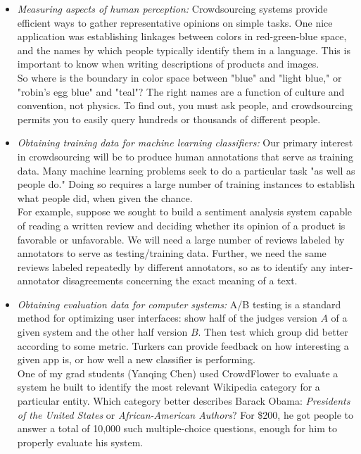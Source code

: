 \documentclass[10pt]{article}
\begin{document}
\begin{itemize}
    \item \textit{Measuring aspects of human perception:} Crowdsourcing systems provide efficient ways to gather representative opinions on simple tasks. One nice application was establishing linkages between colors in red-green-blue space, and the names by which people typically identify them in a language. This is important to know when writing descriptions of products and images.\\
          So where is the boundary in color space between "blue" and "light blue," or "robin’s egg blue" and "teal"? The right names are a function of culture and convention, not physics. To find out, you must ask people, and crowdsourcing permits you to easily query hundreds or thousands of different people.
    \item \textit{Obtaining training data for machine learning classifiers:} Our primary interest in crowdsourcing will be to produce human annotations that serve as training data. Many machine learning problems seek to do a particular task "as well as people do." Doing so requires a large number of training instances to establish what people did, when given the chance.\\
          For example, suppose we sought to build a sentiment analysis system capable of reading a written review and deciding whether its opinion of a product is favorable or unfavorable. We will need a large number of reviews labeled by annotators to serve as testing/training data. Further, we need the same reviews labeled repeatedly by different annotators, so as to identify any inter-annotator disagreements concerning the exact meaning of a text.
    \item \textit{Obtaining evaluation data for computer systems:} A/B testing is a standard method for optimizing user interfaces: show half of the judges version $A$ of a given system and the other half version $B$. Then test which group did better according to some metric. Turkers can provide feedback on how interesting a given app is, or how well a new classifier is performing.\\
          One of my grad students (Yanqing Chen) used CrowdFlower to evaluate a system he built to identify the most relevant Wikipedia category for a particular entity. Which category better describes Barack Obama: \textit{Presidents of the United States} or \textit{African-American Authors}? For \$200, he got people to answer a total of 10,000 such multiple-choice questions, enough for him to properly evaluate his system.

\end{itemize}
\end{document}
